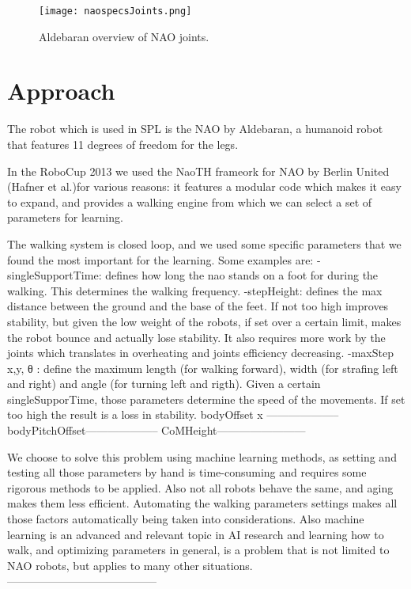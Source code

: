 \documentclass[a4paper, twocolumn]{article}
\begin{document}
\begin{figure}
	\center
	\texttt{[image: naospecsJoints.png]}
	\caption{Aldebaran overview of NAO joints.}
	\label{fig:joints}
\end{figure}

\section{Approach}
The robot which is used in SPL is the NAO by Aldebaran, a humanoid robot that features 11 degrees of freedom for the legs.

In the RoboCup 2013 we used the NaoTH frameork for NAO by Berlin United (Hafner et al.)for various reasons: it features a modular code which makes it easy to expand, and provides a walking engine from which we can select a set of parameters for learning. 

The walking system is closed loop, and we used some specific parameters that we found the most important for the learning.
Some examples are:
-singleSupportTime: defines how long the nao stands on a foot for during the walking. This determines the walking frequency.
-stepHeight: defines the max distance between the ground and the base of the feet. If not too high improves stability, but given the low weight of the robots, if set over a certain limit, makes the robot bounce and actually lose stability. It also requires more work by the joints which translates in overheating and joints efficiency decreasing. 
-maxStep x,y, θ : define the maximum length (for walking forward), width (for strafing left and right) and angle (for turning left and rigth). Given a certain singleSupporTime, those parameters determine the speed of the movements. If set too high the result is a loss in stability.
bodyOffset x --------------------
bodyPitchOffset--------------------
CoMHeight------------------------

We choose to solve this problem using machine learning methods, as setting and testing all those parameters by hand is time-consuming and requires some rigorous methods to be applied. Also not all robots behave the same, and aging makes them less efficient. Automating the walking parameters settings makes all those factors automatically being taken into considerations. Also machine learning is an advanced and relevant topic in AI research and learning how to walk, and optimizing parameters in general, is a problem that is not limited to NAO robots, but applies to many other situations. -----------------------------------------
\end{document}
